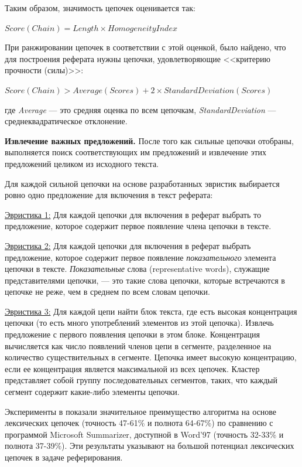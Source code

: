 \documentclass{article}
\begin{document}
\begin{articletext}
Таким образом, значимость цепочек оценивается так:

\begin{center}
$Score(Chain) = Length \times HomogeneityIndex$
\end{center}

При ранжировании цепочек в соответствии с этой оценкой, было найдено, что для построения реферата нужны цепочки, удовлетворяющие <<критерию прочности (силы)>>:

\begin{center}
$Score(Chain) > Average(Scores) + 2 \times StandardDeviation(Scores)$
\end{center}

где \textit{Average} --- это средняя оценка по всем цепочкам, \textit{StandardDeviation} --- среднеквадратическое отклонение.

\textbf{Извлечение важных предложений.} После того как сильные цепочки отобраны, выполняется поиск соответствующих им предложений и извлечение этих предложений целиком из исходного текста.

Для каждой сильной цепочки на основе разработанных эвристик выбирается ровно одно предложение для включения в текст реферата:

\underline{Эвристика 1:} Для каждой цепочки для включения в реферат выбрать то предложение, которое содержит первое появление члена цепочки в тексте.

\underline{Эвристика 2:} Для каждой цепочки для включения в реферат выбрать предложение, которое содержит первое появление \textit{показательного} элемента цепочки в тексте. \textit{Показательные} слова (representative words), служащие представителями цепочки, --- это такие слова цепочки, которые встречаются в цепочке не реже, чем в среднем по всем словам цепочки.

\underline{Эвристика 3:} Для каждой цепи найти блок текста, где есть высокая концентрация цепочки (то есть много употреблений элементов из этой цепочка). Извлечь предложение с первого появления цепочки в этом блоке. Концентрация вычисляется как число появлений членов цепи в сегменте, разделенное на количество существительных в сегменте. Цепочка имеет высокую концентрацию, если ее концентрация является максимальной из всех цепочек. Кластер представляет собой группу последовательных сегментов, таких, что каждый сегмент содержит какие-либо элементы цепочки.

Эксперименты в \cite{Barzilay Elhadad 1997} показали значительное преимущество алгоритма на основе лексических цепочек (точность 47-61\% и полнота 64-67\%) по сравнению с программой Microsoft Summarizer, доступной в Word’97 (точность 32-33\% и полнота 37-39\%). Эти результаты указывают на большой потенциал лексических цепочек в задаче реферирования.



\end{articletext}
\end{document}
